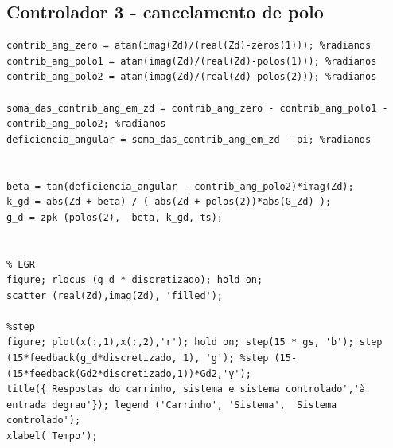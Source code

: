 \documentclass{article}
\begin{document}
\subsection*{Controlador 3 - cancelamento de polo}

\begin{lstlisting}
contrib_ang_zero = atan(imag(Zd)/(real(Zd)-zeros(1))); %radianos
contrib_ang_polo1 = atan(imag(Zd)/(real(Zd)-polos(1))); %radianos
contrib_ang_polo2 = atan(imag(Zd)/(real(Zd)-polos(2))); %radianos

soma_das_contrib_ang_em_zd = contrib_ang_zero - contrib_ang_polo1 - contrib_ang_polo2; %radianos
deficiencia_angular = soma_das_contrib_ang_em_zd - pi; %radianos


beta = tan(deficiencia_angular - contrib_ang_polo2)*imag(Zd);
k_gd = abs(Zd + beta) / ( abs(Zd + polos(2))*abs(G_Zd) );
g_d = zpk (polos(2), -beta, k_gd, ts);


% LGR
figure; rlocus (g_d * discretizado); hold on;
scatter (real(Zd),imag(Zd), 'filled');

%step
figure; plot(x(:,1),x(:,2),'r'); hold on; step(15 * gs, 'b'); step (15*feedback(g_d*discretizado, 1), 'g'); %step (15-(15*feedback(Gd2*discretizado,1))*Gd2,'y');
title({'Respostas do carrinho, sistema e sistema controlado','à entrada degrau'}); legend ('Carrinho', 'Sistema', 'Sistema controlado');
xlabel('Tempo');
\end{lstlisting}
\end{document}
